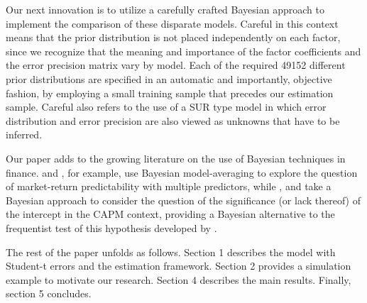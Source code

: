 Our next innovation is to utilize a carefully crafted Bayesian approach to implement the comparison of these disparate models. Careful in this context means that the prior distribution is not placed independently on each factor, since we recognize that the meaning and importance of the factor coefficients and the error precision matrix vary by model. 
Each of the required 49152 different prior distributions are specified in an automatic and importantly, objective fashion, by employing a small training sample that precedes our estimation sample. 
Careful also refers to the use of a SUR type model in which error distribution and error precision are also viewed as unknowns that have to be inferred.



Our paper adds to the growing literature on the use of Bayesian techniques in finance.
\cite{avramov2002stock} and \cite{cremers2002stock}, for example, use Bayesian model-averaging to explore the question of market-return predictability with multiple predictors, while \cite{shanken1987bayesian}, \cite{harvey1990bayesian} and \cite{avramov2006exact} take a Bayesian approach to consider the question of the significance (or lack thereof) of the intercept in the CAPM context, providing a Bayesian alternative to the frequentist test of this hypothesis developed by \cite{gibbons1989test}.



The rest of the paper unfolds as follows.
Section 1 describes the model with Student-t errors and the estimation framework. 
Section 2 provides a simulation example to motivate our research.
Section 4 describes the main results. 
Finally, section 5 concludes. 

